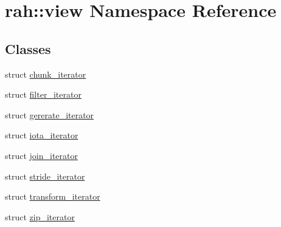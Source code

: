\hypertarget{namespacerah_1_1view}{}\section{rah\+::view Namespace Reference}
\label{namespacerah_1_1view}
\subsection*{Classes}
\begin{DoxyCompactItemize}
\item 
struct \mbox{\hyperlink{structrah_1_1view_1_1chunk__iterator}{chunk\+\_\+iterator}}
\item 
struct \mbox{\hyperlink{structrah_1_1view_1_1filter__iterator}{filter\+\_\+iterator}}
\item 
struct \mbox{\hyperlink{structrah_1_1view_1_1gererate__iterator}{gererate\+\_\+iterator}}
\item 
struct \mbox{\hyperlink{structrah_1_1view_1_1iota__iterator}{iota\+\_\+iterator}}
\item 
struct \mbox{\hyperlink{structrah_1_1view_1_1join__iterator}{join\+\_\+iterator}}
\item 
struct \mbox{\hyperlink{structrah_1_1view_1_1stride__iterator}{stride\+\_\+iterator}}
\item 
struct \mbox{\hyperlink{structrah_1_1view_1_1transform__iterator}{transform\+\_\+iterator}}
\item 
struct \mbox{\hyperlink{structrah_1_1view_1_1zip__iterator}{zip\+\_\+iterator}}
\end{DoxyCompactItemize}
